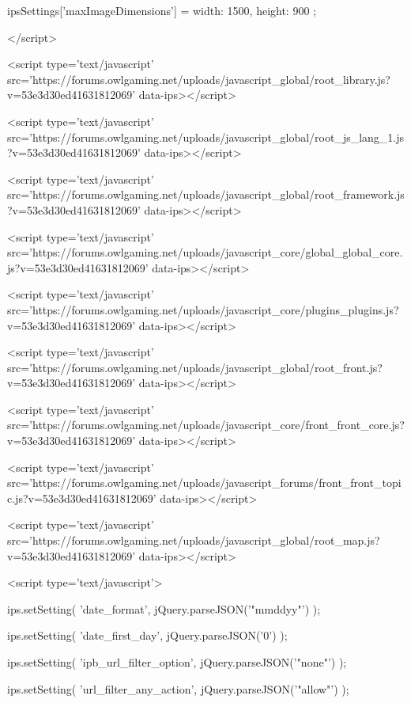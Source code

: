 		
		
		
			ipsSettings['maxImageDimensions'] = {
				width: 1500,
				height: 900
			};
		
		
	</script>





<script type='text/javascript' src='https://forums.owlgaming.net/uploads/javascript_global/root_library.js?v=53e3d30ed41631812069' data-ips></script>


<script type='text/javascript' src='https://forums.owlgaming.net/uploads/javascript_global/root_js_lang_1.js?v=53e3d30ed41631812069' data-ips></script>


<script type='text/javascript' src='https://forums.owlgaming.net/uploads/javascript_global/root_framework.js?v=53e3d30ed41631812069' data-ips></script>


<script type='text/javascript' src='https://forums.owlgaming.net/uploads/javascript_core/global_global_core.js?v=53e3d30ed41631812069' data-ips></script>


<script type='text/javascript' src='https://forums.owlgaming.net/uploads/javascript_core/plugins_plugins.js?v=53e3d30ed41631812069' data-ips></script>


<script type='text/javascript' src='https://forums.owlgaming.net/uploads/javascript_global/root_front.js?v=53e3d30ed41631812069' data-ips></script>


<script type='text/javascript' src='https://forums.owlgaming.net/uploads/javascript_core/front_front_core.js?v=53e3d30ed41631812069' data-ips></script>


<script type='text/javascript' src='https://forums.owlgaming.net/uploads/javascript_forums/front_front_topic.js?v=53e3d30ed41631812069' data-ips></script>


<script type='text/javascript' src='https://forums.owlgaming.net/uploads/javascript_global/root_map.js?v=53e3d30ed41631812069' data-ips></script>



	<script type='text/javascript'>
		
			ips.setSetting( 'date_format', jQuery.parseJSON('"mm\/dd\/yy"') );
		
			ips.setSetting( 'date_first_day', jQuery.parseJSON('0') );
		
			ips.setSetting( 'ipb_url_filter_option', jQuery.parseJSON('"none"') );
		
			ips.setSetting( 'url_filter_any_action', jQuery.parseJSON('"allow"') );
		
